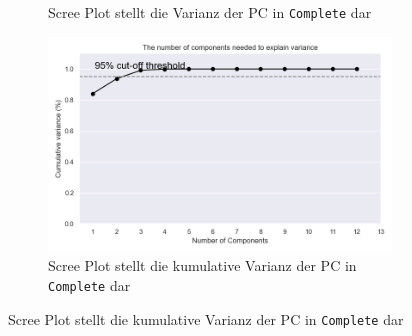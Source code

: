 \begin{figure}
\begin{subfigure}{.5\textwidth}
        \caption{Scree Plot stellt die Varianz der PC in \texttt{Complete} dar}
        \label{fig:scree-complete}
    \end{subfigure}%
    \begin{subfigure}{.5\textwidth}
        \includegraphics[width=\textwidth]{images/30_results/complete-scree-cum.png}
        \caption{Scree Plot stellt die kumulative Varianz der PC in \texttt{Complete} dar}
        \label{fig:scree-cum-complete}
    \end{subfigure}
\end{figure}

\medskip

